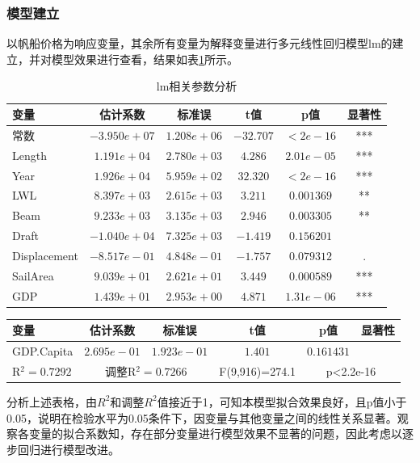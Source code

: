 \documentclass[a4paper,12pt,onecolumn,oneside]{article}
\begin{document}
	\subsubsection{模型建立}
	以帆船价格为响应变量，其余所有变量为解释变量进行多元线性回归模型lm的建立，并对模型效果进行查看，结果如表\ref{tab:lm_analysis}所示。\par
\begin{table}[h]
	\centering
	\caption{lm相关参数分析}\vspace{0.3\baselineskip}
	\label{tab:lm_analysis}
	\begin{tabular}{@{}lccccc@{}}
		\toprule
		变量 & 估计系数 & 标准误 & t值 & p值 & 显著性 \\ \midrule
		常数 & $-3.950e+07$ & $1.208e+06$ & $-32.707$ & $< 2e-16$ & *** \\
		Length & $1.191e+04$ & $2.780e+03$ & $4.286$ & $2.01e-05$ & *** \\
		Year & $1.926e+04$ & $5.959e+02$ & $32.320$ & $< 2e-16$ & *** \\
		LWL & $8.397e+03$ & $2.615e+03$ & $3.211$ & $0.001369$ & ** \\
		Beam & $9.233e+03$ & $3.135e+03$ & $2.946$ & $0.003305$ & ** \\ 
		Draft & $-1.040e+04$ & $7.325e+03$ & $-1.419$ & $0.156201$ &  \\
		Displacement & $-8.517e-01$ & $4.848e-01$ & $-1.757$ & $0.079312$ & . \\
		SailArea & $9.039e+01$ & $2.621e+01$ & $3.449$ & $0.000589$ & *** \\
		GDP & $1.439e+01$ & $2.953e+00$ & $4.871$ & $1.31e-06$ & *** \\
		\bottomrule
	\end{tabular}
\end{table}
\pagebreak
\begin{table}[h]
	\centering
	\begin{tabular}{@{}lccccc@{}}
		\toprule
		变量 & 估计系数 & 标准误 & t值 & p值 & 显著性 \\ \midrule

		GDP.Capita & $2.695e-01$ & $1.923e-01$ & $1.401$ & $0.161431$ &  \\ \midrule
		R$^2=0.7292$ & \multicolumn{2}{c}{调整R$^2=0.7266$} & F(9,916)=274.1 & \multicolumn{2}{c}{p<2.2e-16} \\ \bottomrule
	\end{tabular}
\end{table}

分析上述表格，由$R^2$和调整$R^2$值接近于1，可知本模型拟合效果良好，且p值小于0.05，说明在检验水平为0.05条件下，因变量与其他变量之间的线性关系显著。观察各变量的拟合系数知，存在部分变量进行模型效果不显著的问题，因此考虑以逐步回归进行模型改进。
\end{document}
